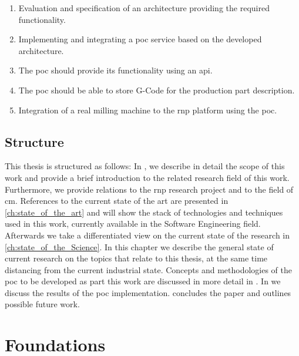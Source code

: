 \documentclass[
a4paper,
twoside,
headsepline,
cleardoublepage=empty,
parskip=half,
draft=false
]{scrbook}
\begin{document}
			\begin{enumerate}

				\item Evaluation and specification of an architecture providing the required functionality.

				\item Implementing and integrating a \gls{poc} service based on the developed architecture.
				
				\item The \gls{poc} should provide its functionality using an \gls{api}.

				\item The \gls{poc} should be able to store G-Code for the production part description.

				\item Integration of a real milling machine to the \gls{rnp} platform using the \gls{poc}.

			\end{enumerate}

		\section{Structure}

			This thesis is structured as follows: In , we describe in detail the scope of this work and provide a brief introduction to the related research field of this work.
			Furthermore, we provide relations to the \gls{rnp} research project and to the field of \gls{cm}.
			References to the current state of the art are presented in \cref{ch:state_of_the_art} and will show the stack of technologies and techniques used in this work, currently available in the Software Engineering field.
			Afterwards we take a differentiated view on the current state of the research in \cref{ch:state_of_the_Science}.
			In this chapter we describe the general state of current research on the topics that relate to this thesis, at the same time distancing from the current industrial state.
			Concepts and methodologies of the \gls{poc} to be developed as part this work are discussed in more detail in .
			In  we discuss the results of the \gls{poc} implementation.
			 concludes the paper and outlines possible future work.

	\chapter{Foundations}\label{ch:foundations}
\end{document}
